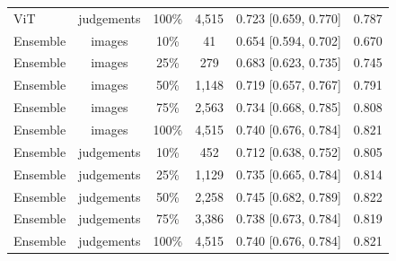 \begin{table}[htbp]
\begin{tabular}{lccccc}
    ViT & judgements & 100\% & 4,515 & 0.723 [0.659, 0.770] & 0.787 \\
    Ensemble & images & 10\% & 41 & 0.654 [0.594, 0.702] & 0.670 \\
    Ensemble & images & 25\% & 279 & 0.683 [0.623, 0.735] & 0.745 \\
    Ensemble & images & 50\% & 1,148 & 0.719 [0.657, 0.767] & 0.791 \\
    Ensemble & images & 75\% & 2,563 & 0.734 [0.668, 0.785] & 0.808 \\
    Ensemble & images & 100\% & 4,515 & 0.740 [0.676, 0.784] & 0.821 \\
    Ensemble & judgements & 10\% & 452 & 0.712 [0.638, 0.752] & 0.805 \\
    Ensemble & judgements & 25\% & 1,129 & 0.735 [0.665, 0.784] & 0.814 \\
    Ensemble & judgements & 50\% & 2,258 & 0.745 [0.682, 0.789] & 0.822 \\
    Ensemble & judgements & 75\% & 3,386 & 0.738 [0.673, 0.784] & 0.819 \\
    Ensemble & judgements & 100\% & 4,515 & 0.740 [0.676, 0.784] & 0.821 \\
    \bottomrule
  \end{tabular}
\end{table}
